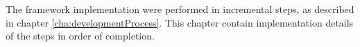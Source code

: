 
The framework implementation were performed in incremental steps, as described in chapter \ref{cha:developmentProcess}. This chapter contain implementation details of the steps in order of completion.

